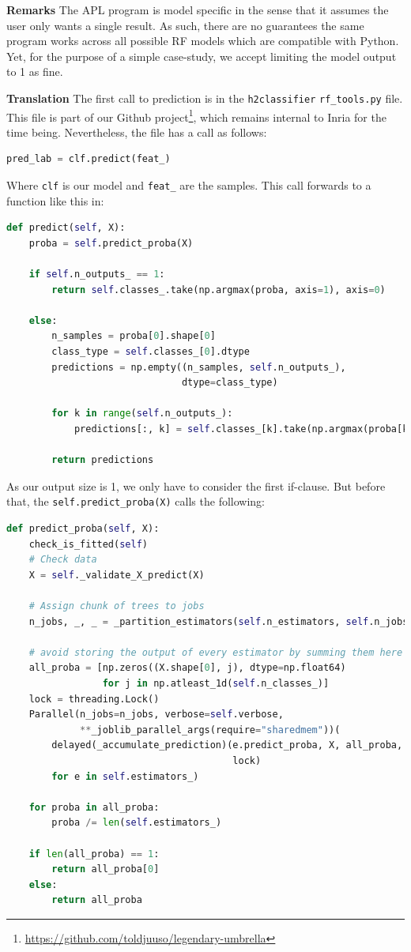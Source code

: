\documentclass{IEEEtran}
\begin{document}
\textbf{Remarks} The APL program is model specific in the sense that it assumes the user only wants a single result. As such, there are no guarantees the same program works across all possible RF models which are compatible with Python. Yet, for the purpose of a simple case-study, we accept limiting the model output to 1 as fine.

\textbf{Translation} The first call to prediction is in the \verb|h2classifier| \verb|rf_tools.py| file. This file is part of our Github project\footnote{\url{https://github.com/toldjuuso/legendary-umbrella}}, which remains internal to Inria for the time being. Nevertheless, the file has a call as follows:

\begin{lstlisting}[language=Python]
pred_lab = clf.predict(feat_)
\end{lstlisting}

Where \verb|clf| is our model and \verb|feat_| are the samples. This call forwards to a function like this in:

\begin{lstlisting}[language=Python]
def predict(self, X):
    proba = self.predict_proba(X)
    
    if self.n_outputs_ == 1:
        return self.classes_.take(np.argmax(proba, axis=1), axis=0)
    
    else:
        n_samples = proba[0].shape[0]
        class_type = self.classes_[0].dtype
        predictions = np.empty((n_samples, self.n_outputs_),
                               dtype=class_type)
    
        for k in range(self.n_outputs_):
            predictions[:, k] = self.classes_[k].take(np.argmax(proba[k], axis=1), axis=0)
    
        return predictions
\end{lstlisting}

As our output size is 1, we only have to consider the first if-clause. But before that, the \verb|self.predict_proba(X)| calls the following:

\begin{lstlisting}[language=Python]
def predict_proba(self, X):
    check_is_fitted(self)
    # Check data
    X = self._validate_X_predict(X)
    
    # Assign chunk of trees to jobs
    n_jobs, _, _ = _partition_estimators(self.n_estimators, self.n_jobs)
    
    # avoid storing the output of every estimator by summing them here
    all_proba = [np.zeros((X.shape[0], j), dtype=np.float64)
                 for j in np.atleast_1d(self.n_classes_)]
    lock = threading.Lock()
    Parallel(n_jobs=n_jobs, verbose=self.verbose,
             **_joblib_parallel_args(require="sharedmem"))(
        delayed(_accumulate_prediction)(e.predict_proba, X, all_proba,
                                        lock)
        for e in self.estimators_)
    
    for proba in all_proba:
        proba /= len(self.estimators_)
    
    if len(all_proba) == 1:
        return all_proba[0]
    else:
        return all_proba
\end{lstlisting}
\end{document}
